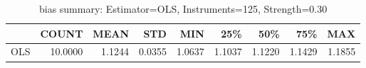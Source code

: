 \begin{table}[ht]
\centering
\caption{bias summary: Estimator=OLS, Instruments=125, Strength=0.30}
\begin{tabular}{lrrrrrrrr}
\toprule
 & COUNT & MEAN & STD & MIN & 25\% & 50\% & 75\% & MAX \\
\midrule
OLS & 10.0000 & 1.1244 & 0.0355 & 1.0637 & 1.1037 & 1.1220 & 1.1429 & 1.1855 \\
\bottomrule
\end{tabular}
\end{table}
